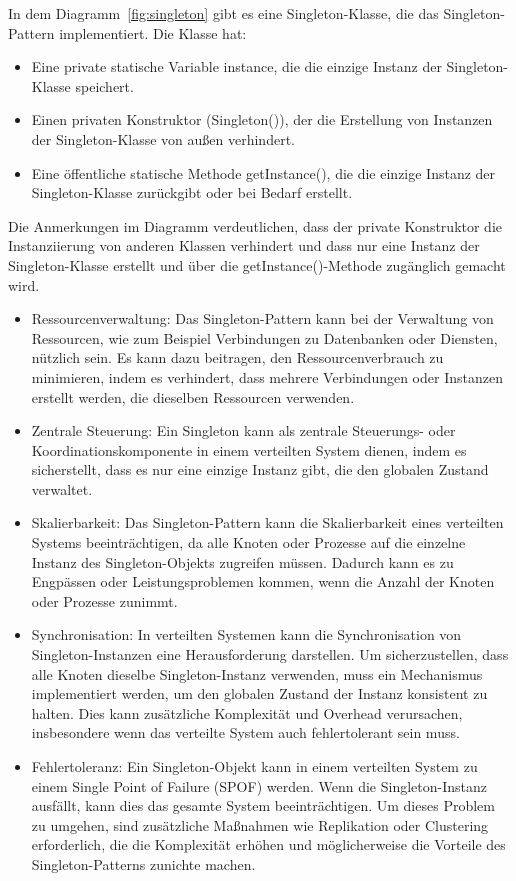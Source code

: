 In dem Diagramm~\ref{fig:singleton} gibt es eine Singleton-Klasse, die das Singleton-Pattern implementiert. Die Klasse hat:
\begin{itemize}
\item Eine private statische Variable instance, die die einzige Instanz der Singleton-Klasse speichert.
\item Einen privaten Konstruktor (Singleton()), der die Erstellung von Instanzen der Singleton-Klasse von außen verhindert.
\item Eine öffentliche statische Methode getInstance(), die die einzige Instanz der Singleton-Klasse zurückgibt oder bei Bedarf erstellt.
\end{itemize}
Die Anmerkungen im Diagramm verdeutlichen, dass der private Konstruktor die Instanziierung von anderen Klassen verhindert und dass nur eine Instanz der Singleton-Klasse erstellt und über die getInstance()-Methode zugänglich gemacht wird.
\begin{itemize}
\item Ressourcenverwaltung: Das Singleton-Pattern kann bei der Verwaltung von Ressourcen, wie zum Beispiel Verbindungen zu Datenbanken oder Diensten, nützlich sein. Es kann dazu beitragen, den Ressourcenverbrauch zu minimieren, indem es verhindert, dass mehrere Verbindungen oder Instanzen erstellt werden, die dieselben Ressourcen verwenden.
\item Zentrale Steuerung: Ein Singleton kann als zentrale Steuerungs- oder Koordinationskomponente in einem verteilten System dienen, indem es sicherstellt, dass es nur eine einzige Instanz gibt, die den globalen Zustand verwaltet.
\end{itemize}
\begin{itemize}
\item Skalierbarkeit: Das Singleton-Pattern kann die Skalierbarkeit eines verteilten Systems beeinträchtigen, da alle Knoten oder Prozesse auf die einzelne Instanz des Singleton-Objekts zugreifen müssen. Dadurch kann es zu Engpässen oder Leistungsproblemen kommen, wenn die Anzahl der Knoten oder Prozesse zunimmt.
\item Synchronisation: In verteilten Systemen kann die Synchronisation von Singleton-Instanzen eine Herausforderung darstellen. Um sicherzustellen, dass alle Knoten dieselbe Singleton-Instanz verwenden, muss ein Mechanismus implementiert werden, um den globalen Zustand der Instanz konsistent zu halten. Dies kann zusätzliche Komplexität und Overhead verursachen, insbesondere wenn das verteilte System auch fehlertolerant sein muss.
\item Fehlertoleranz: Ein Singleton-Objekt kann in einem verteilten System zu einem Single Point of Failure (SPOF) werden. Wenn die Singleton-Instanz ausfällt, kann dies das gesamte System beeinträchtigen. Um dieses Problem zu umgehen, sind zusätzliche Maßnahmen wie Replikation oder Clustering erforderlich, die die Komplexität erhöhen und möglicherweise die Vorteile des Singleton-Patterns zunichte machen.
\end{itemize}
